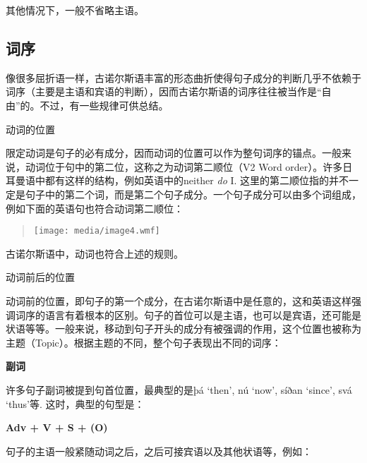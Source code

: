 {{其他情况下，一般不省略主语。

\subsection{词序}\label{词序}

像很多屈折语一样，古诺尔斯语丰富的形态曲折使得句子成分的判断几乎不依赖于词序（主要是主语和宾语的判断），因而古诺尔斯语的词序往往被当作是``自由''的。不过，有一些规律可供总结。

动词的位置

限定动词是句子的必有成分，因而动词的位置可以作为整句词序的锚点。一般来说，动词位于句中的第二位，这称之为动词第二顺位（V2
Word order）。许多日耳曼语中都有这样的结构，例如英语中的neither
\emph{do} I.
这里的第二顺位指的并不一定是句子中的第二个词，而是第二个句子成分。一个句子成分可以由多个词组成，例如下面的英语句也符合动词第二顺位：

\begin{quote}
\texttt{[image: media/image4.wmf]}
\end{quote}

古诺尔斯语中，动词也符合上述的规则。

动词前后的位置

动词前的位置，即句子的第一个成分，在古诺尔斯语中是任意的，这和英语这样强调词序的语言有着根本的区别。句子的首位可以是主语，也可以是宾语，还可能是状语等等。一般来说，移动到句子开头的成分有被强调的作用，这个位置也被称为主题（Topic）。根据主题的不同，整个句子表现出不同的词序：

\textbf{副词}

许多句子副词被提到句首位置，最典型的是þá `then', nú `now', síðan
`since', svá `thus'等. 这时，典型的句型是：

\textbf{Adv + V + S + (O)}

句子的主语一般紧随动词之后，之后可接宾语以及其他状语等，例如：

}}
